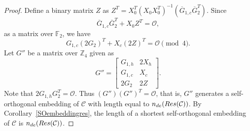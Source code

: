 \documentclass[10pt,a4paper]{amsart}
\begin{document}
\begin{proof}
    Define a binary matrix $Z$ as $Z^T=X_0^T(X_0X_0^T)^{-1}(\overline{G}_{1, c}\overline{G}_2^T)$. Since
    \[
    \overline{G}_{1, c}\overline{G}_2^T+X_0Z^T=\mathcal{O},
    \]
    as a matrix over $\mathbb{F}_2$, we have
    \[
    G_{1, c}(2G_2)^T+X_c(2Z)^T=\mathcal{O}\pmod 4.
    \]
    Let $G''$ be a matrix over $\mathbb{Z}_4$ given as
    \[
    G''=\begin{bmatrix}
        G_{1, h} & 2X_h\\G_{1, c} & X_c\\2G_2 & 2Z
    \end{bmatrix}.
    \]
    Note that $2G_{1, h}G_2^T=\mathcal{O}$. Thus $(G'')(G'')^T=\mathcal{O}$, that is, $G''$ generates a self-orthogonal embedding of $\mathcal{C}$ with length equal to $n_{de}({\rm Res}(\mathcal{C}))$. By Corollary~\ref{SOembeddingres}, the length of a shortest self-orthogonal embedding of $\mathcal{C}$ is $n_{de}({\rm Res}(\mathcal{C}))$.
\end{proof}
\end{document}
